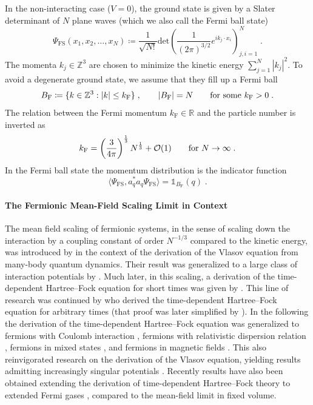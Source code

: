 \documentclass[12pt,a4paper]{article}
\numberwithin{equation}{section}
\newcommand{\ZZZ}{\mathbb{Z}}
\newcommand{\Zbb}{\mathbb{Z}}
\newcommand{\1}{\mathbb{I}}
\newcommand{\F}{\mathrm{F}}
\newcommand{\FS}{\mathrm{FS}}
\newcommand{\kF}{k_\F}
\newcommand{\Rbb}{\mathbb{R}}
\theoremstyle{plain}
\theoremstyle{definition}
\theoremstyle{remark}
\theoremstyle{plain}
\theoremstyle{definition}
\theoremstyle{remark}
\begin{document}
In the non-interacting case ($ V=0 $), the ground state is given by a Slater determinant of $ N $ plane waves (which we also call the Fermi ball state)
\begin{equation}
	\Psi_{\FS}(x_1, x_2, \ldots, x_N) \coloneq \frac{1}{\sqrt{N!}}\text{det}\left(\frac{1}{(2\pi)^{3/2}}e^{ik_j\cdot x_i}\right)^N_{j,i=1} \;.
\end{equation}
The momenta $ k_j \in \Zbb^3$ are chosen to minimize the kinetic energy $ \sum_{j=1}^N |k_j|^2 $. To avoid a degenerate ground state, we assume that they fill up a Fermi ball
\begin{equation}
	B_{\F} \coloneq \{ k \in \ZZZ^3 : |k| \leq \kF \} \;, \qquad
	|B_{\F}| = N \qquad \textnormal{for some } \kF > 0 \;.
\end{equation}
The relation between the Fermi momentum $ \kF \in \Rbb$ and the particle number is inverted as
\begin{equation}
	\kF = \left(\frac{3}{4\pi}\right)^\frac{1}{3}N^\frac{1}{3} + \mathcal{O}(1) \qquad \textnormal{for } N\to \infty \;.
 \end{equation}
In the Fermi ball state the momentum distribution is the indicator function
\begin{equation}
	\langle \Psi_{\FS}, a_q^* a_q \Psi_{\FS} \rangle
	= \mathds{1}_{B_{\F}}(q) \;.
\end{equation}

\paragraph{The Fermionic Mean-Field Scaling Limit in Context} The mean field scaling of fermionic systems, in the sense of scaling down the interaction by a coupling constant of order $N^{-1/3}$ compared to the kinetic energy, was introduced by \cite{NS81} in the context of the derivation of the Vlasov equation from many-body quantum dynamics. Their result was generalized to a large class of interaction potentials by \cite{Spo81}. Much later, in this scaling, a derivation of the time-dependent Hartree--Fock equation for short times was given by \cite{EESY04}. This line of research was continued by \cite{BPS14b} who derived the time-dependent Hartree--Fock equation for arbitrary times (that proof was later simplified by \cite{BD23}). In the following the derivation of the time-dependent Hartree--Fock equation was generalized to fermions with Coulomb interaction \cite{PRSS17}, fermions with relativistic dispersion relation \cite{BPS14a}, fermions in mixed states \cite{BJP+16}, and fermions in magnetic fields \cite{BBMN25}. This also reinvigorated research on the derivation of the Vlasov equation, yielding results admitting increasingly singular potentials \cite{BPSS16, Saf18,Saf20,Saf20a,LS23,Saf21,CLS24}. Recently results have also been obtained extending the derivation of time-dependent Hartree--Fock theory to extended Fermi gases \cite{FPS23,FPS25}, compared to the mean-field limit in fixed volume.
\end{document}
